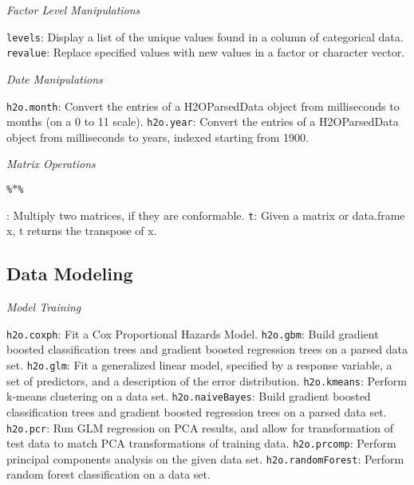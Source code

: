 \documentclass[11pt]{article}
\begin{document}
{{{\emph{Factor Level Manipulations}\par
{\texttt{levels}}: Display a list of the unique values found in a column of categorical data. \newline
{\texttt{revalue}}: Replace specified values with new values in a factor or character vector.\newline

\emph{Date Manipulations}\par
{\texttt{h2o.month}}: Convert the entries of a H2OParsedData object from milliseconds to months (on a 0 to 11 scale). \newline
{\texttt{h2o.year}}: Convert the entries of a H2OParsedData object from milliseconds to years, indexed starting from 1900.\newline

\emph{Matrix Operations}\par
{\texttt{\%$*$\%}}}: Multiply two matrices, if they are conformable.\newline
{\texttt{t}}: Given a matrix or data.frame x, t returns the transpose of x.\newline

\subsection{Data Modeling}

\emph{Model Training}\par
{\texttt{h2o.coxph}}: Fit a Cox Proportional Hazards Model. \newline
{\texttt{h2o.gbm}}: Build gradient boosted classification trees and gradient boosted regression trees on a parsed data set. \newline
{\texttt{h2o.glm}}: Fit a generalized linear model, specified by a response variable, a set of predictors, and a description of the error distribution. \newline
{\texttt{h2o.kmeans}}: Perform k-means clustering on a data set. \newline
{\texttt{h2o.naiveBayes}}: Build gradient boosted classification trees and gradient boosted regression trees on a parsed data set.\newline
{\texttt{h2o.pcr}}: Run GLM regression on PCA results, and allow for transformation of test data to match PCA transformations of training data. \newline
{\texttt{h2o.prcomp}}: Perform principal components analysis on the given data set. \newline
{\texttt{h2o.randomForest}}: Perform random forest classification on a data set.\newline

}}
\end{document}
